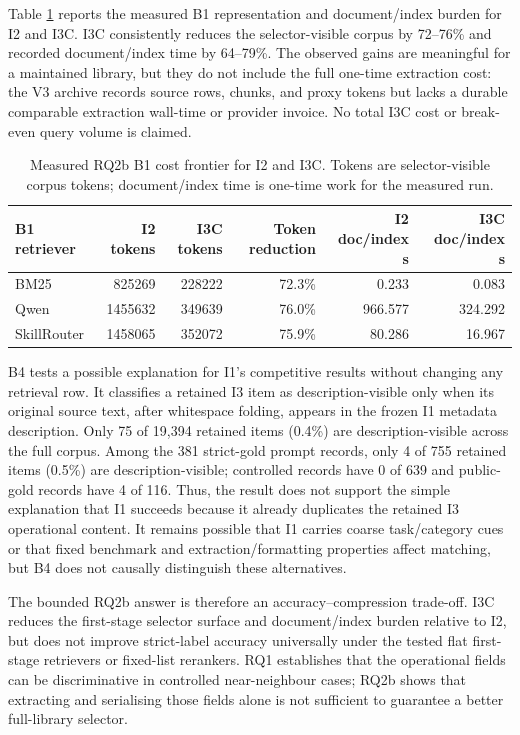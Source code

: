Table \ref{tab:rq2b-cost} reports the measured B1 representation and document/index burden for I2 and I3C. I3C consistently reduces the selector-visible corpus by 72--76\% and recorded document/index time by 64--79\%. The observed gains are meaningful for a maintained library, but they do not include the full one-time extraction cost: the V3 archive records source rows, chunks, and proxy tokens but lacks a durable comparable extraction wall-time or provider invoice. No total I3C cost or break-even query volume is claimed.

\begin{table}[H]
\centering
\scriptsize
\setlength{\tabcolsep}{3pt}
\begin{tabular}{lrrrrr}
\toprule
B1 retriever & I2 tokens & I3C tokens & Token reduction & I2 doc/index s & I3C doc/index s \\
\midrule
BM25 & 825269 & 228222 & 72.3\% & 0.233 & 0.083 \\
Qwen & 1455632 & 349639 & 76.0\% & 966.577 & 324.292 \\
SkillRouter & 1458065 & 352072 & 75.9\% & 80.286 & 16.967 \\
\bottomrule
\end{tabular}
\caption{Measured RQ2b B1 cost frontier for I2 and I3C. Tokens are selector-visible corpus tokens; document/index time is one-time work for the measured run.}
\label{tab:rq2b-cost}
\end{table}

B4 tests a possible explanation for I1's competitive results without changing any retrieval row. It classifies a retained I3 item as description-visible only when its original source text, after whitespace folding, appears in the frozen I1 metadata description. Only 75 of 19,394 retained items (0.4\%) are description-visible across the full corpus. Among the 381 strict-gold prompt records, only 4 of 755 retained items (0.5\%) are description-visible; controlled records have 0 of 639 and public-gold records have 4 of 116. Thus, the result does not support the simple explanation that I1 succeeds because it already duplicates the retained I3 operational content. It remains possible that I1 carries coarse task/category cues or that fixed benchmark and extraction/formatting properties affect matching, but B4 does not causally distinguish these alternatives.

The bounded RQ2b answer is therefore an accuracy--compression trade-off. I3C reduces the first-stage selector surface and document/index burden relative to I2, but does not improve strict-label accuracy universally under the tested flat first-stage retrievers or fixed-list rerankers. RQ1 establishes that the operational fields can be discriminative in controlled near-neighbour cases; RQ2b shows that extracting and serialising those fields alone is not sufficient to guarantee a better full-library selector.

